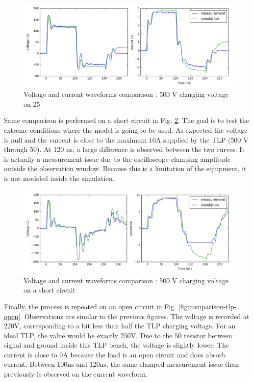 \begin{figure}[!h]
  \centering
  \includegraphics[width=\textwidth]{src/2/figures/tlp_comparison_R25_500V.png}
  \caption{Voltage and current waveforms comparison : 500 V charging voltage on 25\textOmega{}}
  \label{fig:comparison-tlp-load}
\end{figure}

Same comparison is performed on a short circuit in Fig. \ref{fig:comparison-tlp-short}.
The goal is to test the extreme conditions where the model is going to be used.
As expected the voltage is null and the current is close to the maximum 10A supplied by the TLP (500 V through 50\textOmega{}).
At 120 ns, a large difference is observed between the two curves.
It is actually a measurement issue due to the oscilloscope clamping amplitude outside the observation window.
Because this is a limitation of the equipment, it is not modeled inside the simulation.

\begin{figure}[!h]
  \centering
  \includegraphics[width=\textwidth]{src/2/figures/tlp_comparison_short_500V.png}
  \caption{Voltage and current waveforms comparison : 500 V charging voltage on a short circuit}
  \label{fig:comparison-tlp-short}
\end{figure}

Finally, the process is repeated on an open circuit in Fig. \ref{fig:comparison-tlp-open}.
Observations are similar to the previous figures.
The voltage is recorded at 220V, corresponding to a bit less than half the TLP charging voltage.
For an ideal TLP, the value would be exactly 250V.
Due to the 50\textOmega{} resistor between signal and ground inside this TLP bench, the voltage is slightly lower.
The current is close to 0A because the load is an open circuit and does absorb current.
Between 100ns and 120ns, the same clamped measurement issue than previously is observed on the current waveform.


